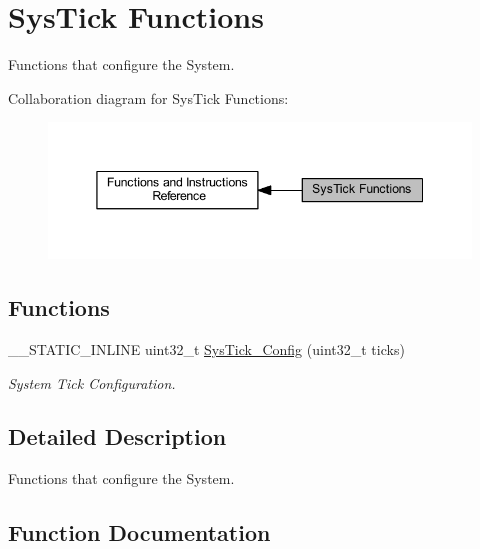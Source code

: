 \hypertarget{group___c_m_s_i_s___core___sys_tick_functions}{}\section{Sys\+Tick Functions}
\label{group___c_m_s_i_s___core___sys_tick_functions}


Functions that configure the System.  


Collaboration diagram for Sys\+Tick Functions\+:
\nopagebreak
\begin{figure}[H]
\begin{center}
\leavevmode
\includegraphics[width=345pt]{group___c_m_s_i_s___core___sys_tick_functions}
\end{center}
\end{figure}
\subsection*{Functions}
\begin{DoxyCompactItemize}
\item 
\+\_\+\+\_\+\+S\+T\+A\+T\+I\+C\+\_\+\+I\+N\+L\+I\+NE uint32\+\_\+t \hyperlink{group___c_m_s_i_s___core___sys_tick_functions_gae4e8f0238527c69f522029b93c8e5b78}{Sys\+Tick\+\_\+\+Config} (uint32\+\_\+t ticks)
\begin{DoxyCompactList}\small\item\em System Tick Configuration. \end{DoxyCompactList}\end{DoxyCompactItemize}


\subsection{Detailed Description}
Functions that configure the System. 



\subsection{Function Documentation}
\mbox{\label{group___c_m_s_i_s___core___sys_tick_functions_gae4e8f0238527c69f522029b93c8e5b78}} 
